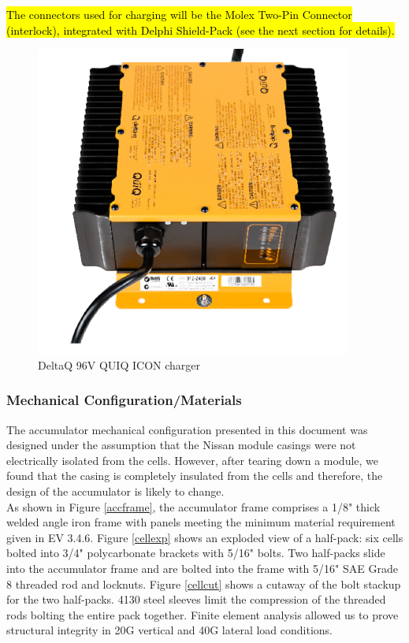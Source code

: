 \documentclass{article}
\DeclareRobustCommand{\hlr}[1]{{\sethlcolor{red}\hl{#1}}}
\begin{document}
            \hlr{The connectors used for charging will be the Molex Two-Pin Connector (interlock), integrated with Delphi Shield-Pack (see the next section for details).}


            \begin{figure}[H]
                \centering
                \includegraphics[width = 0.5 \textwidth]{chargepic}
                \caption{DeltaQ 96V QUIQ ICON charger}
                \label{chargepic}
            \end{figure}

        \subsubsection{Mechanical Configuration/Materials}


            The accumulator mechanical configuration presented in this document was designed under the assumption that the Nissan module casings were not electrically isolated from the cells. However, after tearing down a module, we found that the casing is completely insulated from the cells and therefore, the design of the accumulator is likely to change.\\

            As shown in Figure \ref{accframe}, the accumulator frame comprises a 1/8" thick welded angle iron frame with panels meeting the minimum material requirement given in EV 3.4.6. Figure \ref{cellexp} shows an exploded view of a half-pack: six cells bolted into 3/4" polycarbonate brackets with 5/16" bolts. Two half-packs slide into the accumulator frame and are bolted into the frame with 5/16" SAE Grade 8 threaded rod and locknuts. Figure \ref{cellcut} shows a cutaway of the bolt stackup for the two half-packs. 4130 steel sleeves limit the compression of the threaded rods bolting the entire pack together. Finite element analysis allowed us to prove structural integrity in 20G vertical and 40G lateral load conditions.
\end{document}
